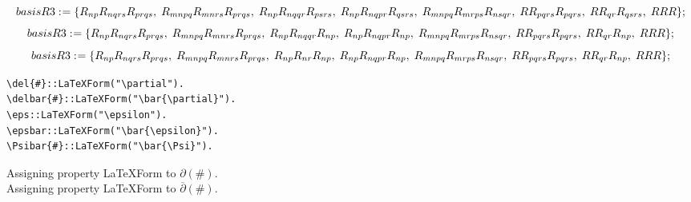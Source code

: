 \documentclass[11pt]{article}
\def\specialcolon{\mathrel{\mathop{:}}\hspace{-.5em}}
\renewcommand{\bar}[1]{\overline{#1}}
\begin{document}
\begin{dmath*}[compact, spread=2pt]
basisR3\specialcolon{}= \{{R}_{n p} {R}_{n q r s} {R}_{p r q s},\; {R}_{m n p q} {R}_{m n r s} {R}_{p r q s},\; {R}_{n p} {R}_{n q q r} {R}_{p s r s},\; {R}_{n p} {R}_{n q p r} {R}_{q s r s},\; {R}_{m n p q} {R}_{m r p s} {R}_{n s q r},\; R {R}_{p q r s} {R}_{p q r s},\; R {R}_{q r} {R}_{q s r s},\; R R R\};
\end{dmath*}
\begin{dmath*}[compact, spread=2pt]
basisR3\specialcolon{}= \{{R}_{n p} {R}_{n q r s} {R}_{p r q s},\; {R}_{m n p q} {R}_{m n r s} {R}_{p r q s},\; {R}_{n p} {R}_{n q q r} {R}_{np},\; {R}_{n p} {R}_{n q p r} {R}_{np},\; {R}_{m n p q} {R}_{m r p s} {R}_{n s q r},\; R {R}_{p q r s} {R}_{p q r s},\; R {R}_{q r} {R}_{np},\; R R R\};
\end{dmath*}
\begin{dmath*}[compact, spread=2pt]
basisR3\specialcolon{}= \{{R}_{n p} {R}_{n q r s} {R}_{p r q s},\; {R}_{m n p q} {R}_{m n r s} {R}_{p r q s},\; {R}_{n p} {R}_{n r} {R}_{np},\; {R}_{n p} {R}_{n q p r} {R}_{np},\; {R}_{m n p q} {R}_{m r p s} {R}_{n s q r},\; R {R}_{p q r s} {R}_{p q r s},\; R {R}_{q r} {R}_{np},\; R R R\};
\end{dmath*}
{\color[named]{Blue}\begin{verbatim}
\del{#}::LaTeXForm("\partial").
\delbar{#}::LaTeXForm("\bar{\partial}").
\eps::LaTeXForm("\epsilon").
\epsbar::LaTeXForm("\bar{\epsilon}").
\Psibar{#}::LaTeXForm("\bar{\Psi}").
\end{verbatim}}
Assigning property LaTeXForm to $\partial(\#)$.
\\
Assigning property LaTeXForm to $\bar{\partial}(\#)$.
\\
\end{document}

